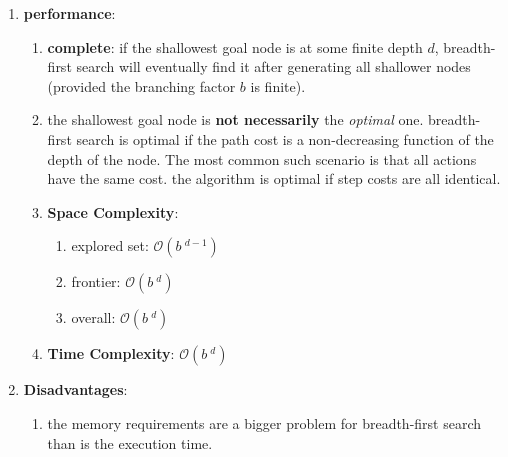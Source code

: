 \begin{enumerate}[itemsep=0.2cm]
    \item \textbf{performance}:
    \begin{enumerate}[itemsep=0.2cm]
        \item \textbf{complete}: if the shallowest goal node is at some finite depth $d$, breadth-first search will eventually find it after generating all shallower nodes (provided the branching factor $b$ is finite). 
        \hfill \cite{ai/book/Artificial-Intelligence-A-Modern-Approach/Russell-Norvig}

        \item  the shallowest goal node is \textbf{not necessarily} the \textit{optimal} one. 
        breadth-first search is optimal if the path cost is a non-decreasing function of the depth of the node.
        The most common such scenario is that all actions have the same cost.
        the algorithm is optimal if step costs are all identical.
        \hfill \cite{ai/book/Artificial-Intelligence-A-Modern-Approach/Russell-Norvig}

        \item \textbf{Space Complexity}:
        \begin{enumerate}[itemsep=0.1cm]
            \item explored set: $\mathcal{O}(b\ ^{d-1})$
            \hfill \cite{ai/book/Artificial-Intelligence-A-Modern-Approach/Russell-Norvig}

            \item frontier: $\mathcal{O}(b\ ^{d})$
            \hfill \cite{ai/book/Artificial-Intelligence-A-Modern-Approach/Russell-Norvig}

            \item overall: $\mathcal{O}(b\ ^{d})$
            \hfill \cite{ai/book/Artificial-Intelligence-A-Modern-Approach/Russell-Norvig}
        \end{enumerate}

        \item \textbf{Time Complexity}: 
        $\mathcal{O}(b\ ^{d})$
        \hfill \cite{ai/book/Artificial-Intelligence-A-Modern-Approach/Russell-Norvig}

    \end{enumerate}

    \item \textbf{Disadvantages}:
    \begin{enumerate}[itemsep=0.1cm]
        \item the memory requirements are a bigger problem for breadth-first search than is the execution time.
        \hfill \cite{ai/book/Artificial-Intelligence-A-Modern-Approach/Russell-Norvig}

        
    \end{enumerate}

\end{enumerate}


